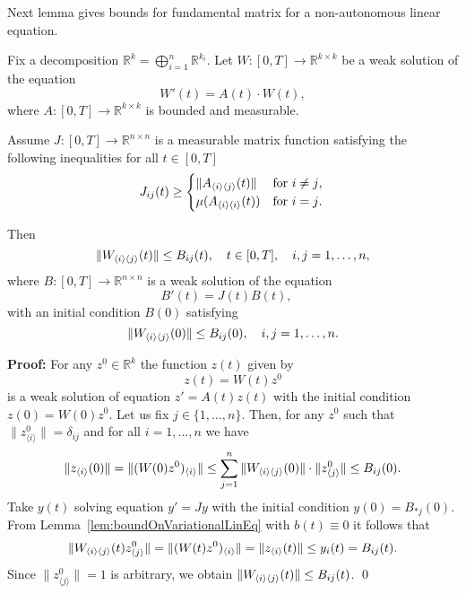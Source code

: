 Next lemma gives bounds for fundamental matrix for a non-autonomous linear equation.
\begin{lemma}
\label{lem:comp-lin-problems}
Fix	a decomposition $\mathbb R^{k}=\bigoplus_{i=1}^n \mathbb{R}^{k_i}$. Let $W:[0,T] \to \mathbb{R}^{k\times k}$ be a weak solution of the equation
\begin{equation*}
  W'(t)=A(t) \cdot W(t),
\end{equation*}
where  $A:[0,T]\to {\mathbb R}^{k \times k}$ is bounded and measurable. 

Assume $J:[0,T] \to \mathbb{R}^{n \times n}$ is a measurable matrix function satisfying the following inequalities for all $t \in [0,T]$
\begin{equation*}
 J_{ij}(t) \geq
  \begin{cases}
	\|A_{\langle i \rangle \langle j \rangle}(t) \|  & \text{for $i \neq j$}, \\
	\mu(A_{\langle i \rangle \langle i \rangle}(t))  & \text{for $i=j$}.
\end{cases}\\
\end{equation*}

Then
\begin{equation*}
	\|W_{\langle i \rangle \langle j \rangle}(t)\| \leq B_{ij}(t), \quad t \in [0,T],  \quad i,j=1,\dots,n,
\end{equation*}
where $B:[0,T] \to \mathbb{R}^{n \times n}$ is a weak solution of the equation 
\begin{equation*}
   B'(t)=J(t)B(t),\quad 
\end{equation*}
with an initial condition $B(0)$ satisfying 
\begin{equation*}
  \|W_{\langle i \rangle \langle j \rangle}(0)\| \leq  B_{ij}(0), \quad i,j=1,\dots,n.
\end{equation*}
\end{lemma}
\textbf{Proof:}
For any $z^0 \in \mathbb{R}^k$ the function $z(t)$ given by
\begin{equation*}
  z(t)=W(t)z^0
\end{equation*}
is a weak solution of equation $z'=A(t)z(t)$ with the initial condition $z(0)=W(0)z^0$. Let us fix $j \in \{1,\dots,n\}$. Then, for any $z^0$ such that $\|z^0_{\langle i\rangle}\|=\delta_{ij}$ and for all $i=1,\ldots,n$ we have 
\begin{eqnarray*}
	\|z_{\langle i\rangle }(0)\| = \|(W(0)z^0)_{\langle i\rangle }\| \leq \sum_{j=1}^n \|W_{\langle i \rangle \langle j \rangle}(0)\| \cdot \| z^0_{\langle j\rangle }\| \leq B_{ij}(0).
\end{eqnarray*}
Take  $y(t)$ solving equation $y'=Jy$ with the initial condition $y(0)=B_{\ast j}(0)$. From Lemma~\ref{lem:boundOnVariationalLinEq} with $b(t)\equiv 0$ it follows that 
\begin{equation*}
\|W_{\langle i \rangle \langle j \rangle}(t)z^0_{\langle j\rangle }\| = \|(W(t)z^0)_{\langle i\rangle }\| = \|z_{\langle i\rangle}(t)\| \leq y_i(t) = B_{ij}(t).
\end{equation*}
Since $\|z^0_{\langle j\rangle}\|=1$ is arbitrary, we obtain $\|W_{\langle i \rangle \langle j \rangle}(t)\| \leq B_{ij}(t)$.
\qed


